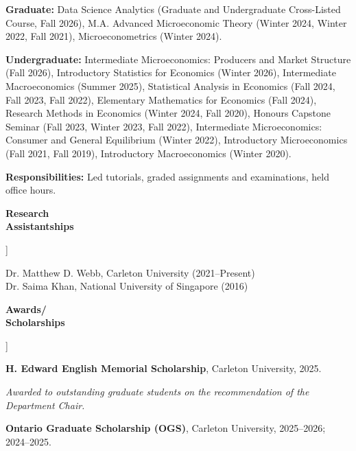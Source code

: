 \documentclass[11pt]{article}
\newcommand{\cvlabel}[1]{%
    \raisebox{0pt}[0pt][0pt]{%
        \parbox[t]{1.38in}{%
            \raggedright
            \bfseries
            #1
        }%
    }%
}
\newcommand{\smallgap}{%
    \vspace{0.45em}
}
\newcommand{\awarddesc}[1]{%
    \par
    \hspace{0.5em}
    \textit{#1}
}
\begin{document}
\begin{cvsections}
\begin{cvitems}

\item
\textbf{Graduate:}
Data Science Analytics
(Graduate and Undergraduate Cross-Listed Course, Fall 2026),
M.A. Advanced Microeconomic Theory
(Winter 2024, Winter 2022, Fall 2021),
Microeconometrics
(Winter 2024).


\item
\textbf{Undergraduate:}
Intermediate Microeconomics:
Producers and Market Structure
(Fall 2026),
Introductory Statistics for Economics
(Winter 2026),
Intermediate Macroeconomics
(Summer 2025),
Statistical Analysis in Economics
(Fall 2024, Fall 2023, Fall 2022),
Elementary Mathematics for Economics
(Fall 2024),
Research Methods in Economics
(Winter 2024, Fall 2020),
Honours Capstone Seminar
(Fall 2023, Winter 2023, Fall 2022),
Intermediate Microeconomics:
Consumer and General Equilibrium
(Winter 2022),
Introductory Microeconomics
(Fall 2021, Fall 2019),
Introductory Macroeconomics
(Winter 2020).


\item
\textbf{Responsibilities:}
Led tutorials,
graded assignments and examinations,
held office hours.

\end{cvitems}


\item[\cvlabel{Research\\Assistantships}]

Dr. Matthew D. Webb,
Carleton University
(2021--Present)
\\
Dr. Saima Khan,
National University of Singapore
(2016)


\item[\cvlabel{Awards/\\Scholarships}]

\textbf{H. Edward English Memorial Scholarship},
Carleton University,
2025.

\awarddesc{
Awarded to outstanding graduate students on the recommendation
of the Department Chair.
}

\smallgap

\textbf{Ontario Graduate Scholarship (OGS)},
Carleton University,
2025--2026;
2024--2025.


\end{cvsections}
\end{document}
